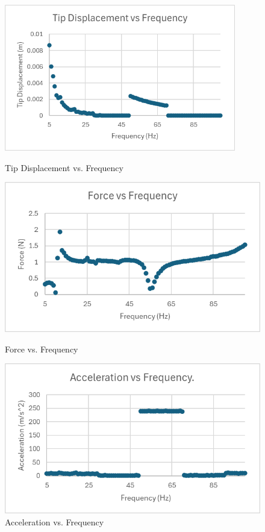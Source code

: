 \documentclass{article}
\begin{document}
\begin{figure}[H]
        \centering
        \begin{minipage}{.5\textwidth}
            \centering
            \includegraphics[width=0.9\textwidth]{lab7images/tipdisvsfreq.png}
            \caption{Tip Displacement vs. Frequency}
            \label{fig:tipdisvsfreq}
        \end{minipage}%
        \begin{minipage}{.5\textwidth}
            \centering
            \includegraphics[width=.95\linewidth]{lab7images/forcevsfreq.png}
            \caption{Force vs. Frequency}
            \label{fig:forcevsfreq}
        \end{minipage}
        \begin{minipage}{.5\textwidth}
            \centering
            \includegraphics[width=.95\linewidth]{lab7images/accvsfreq.png}
            \caption{Acceleration vs. Frequency}
            \label{fig:accvsfreq}
        \end{minipage}
        \label{fig:thingsvfreq}
\end{figure}
\end{document}
